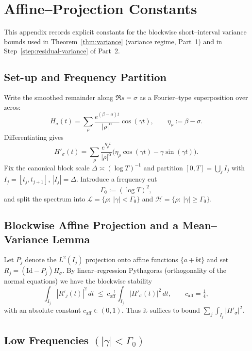 
\appendix

\section{Affine–Projection Constants}
\label{app:A}

This appendix records explicit constants for the blockwise
short–interval variance bounds used in
Theorem~\ref{thm:variance} (variance regime, Part~1) and in
Step~\ref{step:residual-variance} of Part~2.

\subsection{Set-up and Frequency Partition}

Write the smoothed remainder along $\Re s=\sigma$ as a Fourier–type
superposition over zeros:
\[
H_\sigma(t)=\sum_{\rho}\frac{e^{(\beta-\sigma)t}}{|\rho|^{\alpha}}\cos(\gamma t),
\qquad
\eta_\rho:=\beta-\sigma .
\]
Differentiating gives
\[
H'_\sigma(t)=\sum_{\rho}\frac{e^{\eta_\rho t}}{|\rho|^{\alpha}}
\bigl(\eta_\rho\cos(\gamma t)-\gamma\sin(\gamma t)\bigr).
\]
Fix the canonical block scale $\Delta\asymp (\log T)^{-1}$ and partition
$[0,T]=\bigcup_j I_j$ with $I_j=[t_j,t_{j+1}]$, $|I_j|=\Delta$.
Introduce a frequency cut
\[
\Gamma_0:=(\log T)^2,
\]
and split the spectrum into
\(
\mathcal{L}=\{\rho:\ |\gamma|<\Gamma_0\}
\)
and
\(
\mathcal{H}=\{\rho:\ |\gamma|\ge \Gamma_0\}.
\)

\subsection{Blockwise Affine Projection and a Mean–Variance Lemma}

Let $P_j$ denote the $L^2(I_j)$ projection onto affine functions
$\{a+bt\}$ and set $R_j=(\mathrm{Id}-P_j)H_\sigma$.
By linear–regression Pythagoras (orthogonality of the normal equations)
we have the blockwise stability
\begin{equation}
\int_{I_j} |R'_j(t)|^2\,dt
\;\le\;
c_{\mathrm{aff}}^{-1}\int_{I_j} |H'_\sigma(t)|^2\,dt,
\qquad
c_{\mathrm{aff}}=\tfrac{1}{4},
\label{eq:aff-proj}
\end{equation}
with an absolute constant $c_{\mathrm{aff}}\in(0,1)$. Thus it suffices to
bound $\sum_j\int_{I_j}|H'_\sigma|^2$.

\subsection{Low Frequencies \texorpdfstring{$(|\gamma|<\Gamma_0)$}{(low)}}

